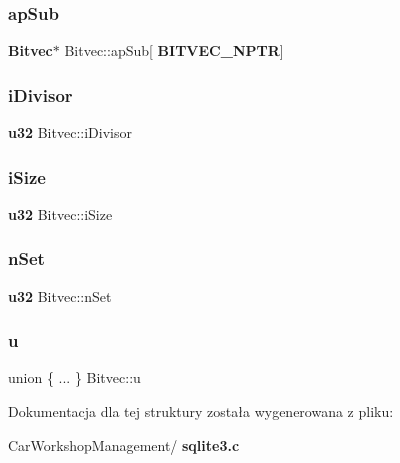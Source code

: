 \mbox{\label{struct_bitvec_ab4942527f1862bbd8e1ffe45486d1541}} 
\subsubsection{apSub}
{\footnotesize\ttfamily \textbf{ Bitvec}$\ast$ Bitvec\+::ap\+Sub[\textbf{ B\+I\+T\+V\+E\+C\+\_\+\+N\+P\+TR}]}

\mbox{\label{struct_bitvec_a22cdb23eb424e07b6ce922de018a83d9}} 
\subsubsection{iDivisor}
{\footnotesize\ttfamily \textbf{ u32} Bitvec\+::i\+Divisor}

\mbox{\label{struct_bitvec_ab36df8ece98aee080bae6de28c237de8}} 
\subsubsection{iSize}
{\footnotesize\ttfamily \textbf{ u32} Bitvec\+::i\+Size}

\mbox{\label{struct_bitvec_ad6811debae9b972f2d94d667e994e3f6}} 
\subsubsection{nSet}
{\footnotesize\ttfamily \textbf{ u32} Bitvec\+::n\+Set}

\mbox{\label{struct_bitvec_afe4bc7add73122665180e68be91852e8}} 
\subsubsection{u}
{\footnotesize\ttfamily union \{ ... \}   Bitvec\+::u}



Dokumentacja dla tej struktury została wygenerowana z pliku\+:\begin{DoxyCompactItemize}
\item 
Car\+Workshop\+Management/\textbf{ sqlite3.\+c}\end{DoxyCompactItemize}
